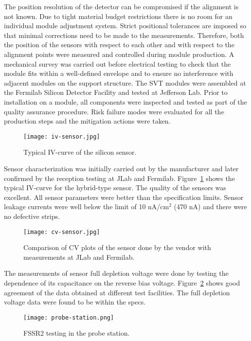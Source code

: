 The position resolution of the detector can be compromised if the alignment is not known. Due to tight material budget restrictions there is no room for an individual module adjustment system. Strict positional tolerances are imposed so that minimal corrections need to be made to the measurements. Therefore, both the position of the sensors with respect to each other and with respect to the alignment points were measured and controlled during module production. A mechanical survey was  carried out before electrical testing to check that the module fits within a well-defined envelope and to ensure no interference with adjacent modules on the support structure. The SVT modules were assembled at the Fermilab Silicon Detector Facility and tested at Jefferson Lab. Prior to installation on a module, all components were inspected and tested as part of the quality assurance procedure. Risk failure modes were evaluated for all the production steps and the mitigation actions were taken.

\begin{figure}[hbt] 
\centering 
\texttt{[image: iv-sensor.jpg]}
\caption{Typical IV-curve of the silicon sensor.}
\label{fig:iv-sensor}
\end{figure}

Sensor characterization was initially carried out by the manufacturer and later confirmed by the reception testing at JLab and Fermilab. Figure~\ref{fig:iv-sensor} shows the typical IV-curve for the hybrid-type sensor. The quality of the sensors was excellent. All sensor parameters were better than the specification limits. Sensor leakage currents were well below the limit of 10 nA/cm$^2$ (470 nA) and there were no defective strips. 

\begin{figure}[hbt] 
\centering 
\texttt{[image: cv-sensor.jpg]}
\caption{Comparison of CV plots of the sensor done by the vendor with measurements at JLab and Fermilab.}
\label{fig:cv-sensor}
\end{figure}

The measurements of sensor full depletion voltage were done by testing the dependence of its capacitance on the reverse bias voltage. Figure~\ref{fig:cv-sensor} shows good agreement of the data obtained at different test facilities. The full depletion voltage data were found to be within the specs. 

\begin{figure}[hbt] 
\centering 
\texttt{[image: probe-station.png]}
\caption{FSSR2 testing in the probe station.}
\label{fig:probe-station}
\end{figure}

